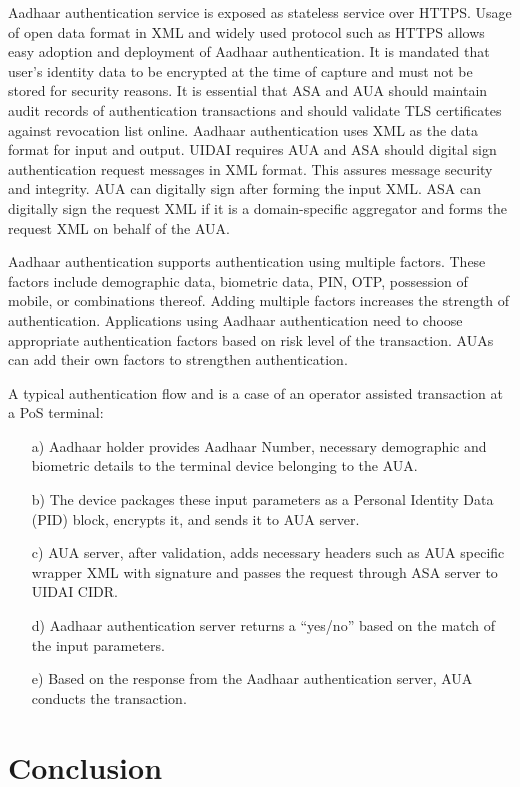 \begin{multicols}{2}
Aadhaar authentication service is exposed as stateless service over HTTPS. Usage of open data format in XML and widely used protocol such as HTTPS allows easy adoption and deployment of Aadhaar authentication. It is mandated that user's identity data to be encrypted at the time of capture and must not be stored for security reasons. It is essential that ASA and AUA should maintain audit records of authentication transactions and should validate TLS certificates against revocation list online. Aadhaar authentication uses XML as the data format for input and output. UIDAI requires AUA and ASA should digital sign authentication request messages in XML format. This assures message security and integrity. AUA can digitally sign after forming the input XML. ASA can digitally sign the request XML if it is a domain-specific aggregator and forms the request XML on behalf of the AUA.
 
Aadhaar authentication supports authentication using multiple factors. These factors include demographic data, biometric data, PIN, OTP, possession of mobile, or combinations thereof. Adding multiple factors increases the strength of authentication. Applications using Aadhaar authentication need to choose appropriate authentication factors based on risk level of the transaction. AUAs can add their own factors to strengthen authentication.
 
A typical authentication flow and is a case of an operator assisted transaction at a PoS terminal:
\begin{itemize}
\item[a)] Aadhaar holder provides Aadhaar Number, necessary demographic and biometric details to the terminal device belonging to the AUA.
\item[b)] The device packages these input parameters as a Personal Identity Data (PID) block, encrypts it, and sends it to AUA server.	
\item[c)] AUA server, after validation, adds necessary headers such as AUA specific wrapper XML with signature and passes the request through ASA server to UIDAI CIDR.	
\item[d)] Aadhaar authentication server returns a ``yes/no'' based on the match of the input parameters.
\item[e)] Based on the response from the Aadhaar authentication server, AUA conducts the transaction.
\end{itemize}

\section*{Conclusion}


\end{multicols}
